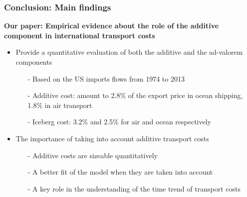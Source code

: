 \documentclass[10 pt,Helvetica, french]{beamer}
\begin{document}
\begin{frame}
\frametitle{Conclusion: Main findings}
\textbf{Our paper: Empirical evidence about the role of the additive component in international transport costs} \vspace{0.1cm}
\begin{itemize}
\item Provide a quantitative evaluation of both the additive and the ad-valorem components \vspace{0.1cm}
\begin{itemize}
\item[-] Based on the US imports flows from 1974 to 2013 \vspace{0.1cm}
\item[-] Additive cost: amount to 2.8\% of the export price in ocean shipping, 1.8\% in air transport \vspace{0.1cm}
\item[-] Iceberg cost: 3.2\% and 2.5\% for air and ocean respectively \vspace{0.1cm}
\end{itemize}
\item The importance of taking into account additive transport costs \vspace{0.1cm}
\begin{itemize}
\item[-] Additive costs are sizeable quantitatively \vspace{0.1cm}
\item[-] A better fit of the model when they are taken into account    \vspace{0.1cm}
\item[-] A key role in the understanding of the time trend of transport costs
\end{itemize}

\end{itemize}

\end{frame}
\end{document}
